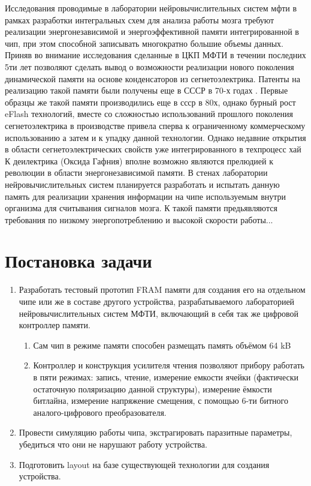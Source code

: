 \documentclass[a4paper,12pt]{article} %
\begin{document}
Исследования проводимые в лаборатории нейровычислительных систем мфти в рамках разработки интегральных схем для анализа работы мозга требуют реализации энергонезависимой и энергоэффективной памяти интегрированной в чип, при этом способной записывать многократно большие объемы данных. Приняв во внимание исследования сделанные в ЦКП МФТИ в течении последних 5ти лет \cite{Segneto_MIPT-I}\cite{Segneto_MIPT-II}\cite{Segneto_MIPT-III} позволяют сделать вывод о возможности реализации нового поколения динамической памяти на основе конденсаторов из сегнетоэлектрика. Патенты на реализацию такой памяти были получены еще в СССР в 70-х годах \cite{patent}. Первые образцы же  такой памяти производились еще в ссср в 80х, однако бурный рост eFlash технологий, вместе со сложностью использований прошлого поколения сегнетоэлектрика в производстве привела сперва к ограниченному коммерческому использованию а затем и к упадку данной технологии. Однако недавние открытия в области сегнетоэлектрических свойств уже интегрированного в техпроцесс хай К деилектрика (Оксида Гафния) вполне возможно являются прелюдией к революции в области энергонезависимой памяти. В стенах лаборатории нейровычислительных систем планируется разработать и испытать данную память для реализации хранения информации на чипе используемым внутри организма для считывания сигналов мозга. К такой памяти предьявляются требования по низкому энергопотреблению и высокой скорости работы...

\section{Постановка задачи}


\begin{enumerate}
   \item Разработать тестовый прототип FRAM памяти для создания его на отдельном чипе или же в составе другого устройства,  разрабатываемого лабораторией нейровычислительных систем  МФТИ, включающий в себя так же цифровой контроллер памяти.
\begin{enumerate}[a]


   \item Сам чип в режиме памяти способен размещать память объёмом 64 kB
   \item Контроллер и конструкция усилителя чтения позволяют прибору работать в пяти  режимах: запись, чтение, измерение емкости ячейки (фактически остаточную поляризацию данной структуры), измерение ёмкости битлайна, измерение напряжение смещения, с помощью 6-ти битного аналого-цифрового преобразователя. 
\end{enumerate}
   \item Провести симуляцию работы чипа, экстрагировать паразитные параметры, убедиться что они не нарушают работу устройства. 
   \item Подготовить layout на базе существующей технологии для создания устройства. 
  \end{enumerate} %
\end{document}
